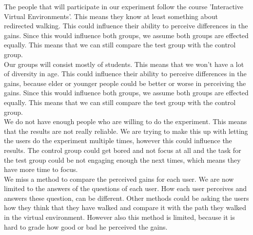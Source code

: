 
The people that will participate in our experiment follow the course 'Interactive Virtual Environments'. This means they know at least something about redirected walking. This could influence their ability to perceive differences in the gains. Since this would influence both groups, we assume both groups are effected equally. This means that we can still compare the test group with the control group.\\
Our groups will consist mostly of students. This means that we won't have a lot of diversity in age.  This could influence their ability to perceive differences in the gains, because elder or younger people could be better or worse in perceiving the gains. Since this would influence both groups, we assume both groups are effected equally. This means that we can still compare the test group with the control group.\\
We do not have enough people who are willing to do the experiment. This means that the results are not really reliable. We are trying to make this up with letting the  users do the experiment multiple times,  however this could influence the results. The control group could get bored and not focus at all and the task for the test group could be not engaging enough the next times, which means they have more time to focus.  \\
We miss a method to compare the perceived gains for each user. We are now limited to the answers of the questions of each user. How each user perceives and answers these question, can be different.  Other methods could be asking the users how they think that they have walked and compare it with the path they walked in the virtual environment. However also this method is limited, because it is hard to grade how good or bad he perceived the gains. \\




